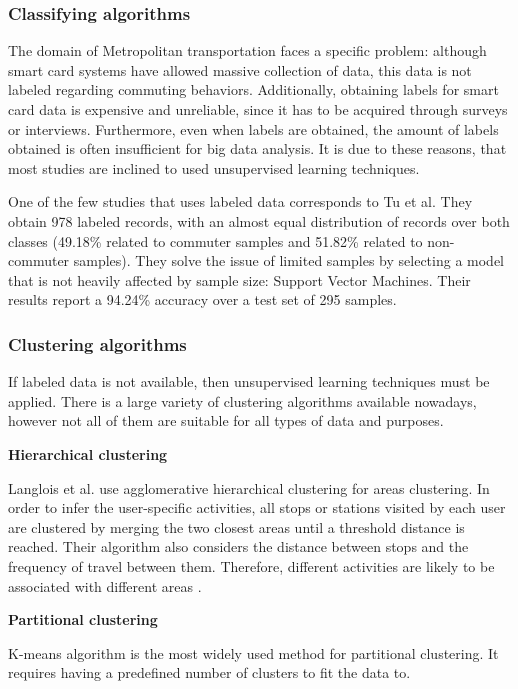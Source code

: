 \documentclass{article}
\begin{document}
\subsubsection{Classifying algorithms}
The domain of Metropolitan transportation faces a specific problem: although smart card systems have allowed massive collection of data, this data is not labeled regarding commuting behaviors. Additionally, obtaining labels for smart card data is expensive and unreliable, since it has to be acquired through surveys or interviews. Furthermore, even when labels are obtained, the amount of labels obtained is often insufficient for big data analysis. It is due to these reasons, that most studies are inclined to used unsupervised learning techniques. 

One of the few studies that uses labeled data corresponds to Tu et al. They obtain 978 labeled records, with an almost equal distribution of records over both classes (49.18\% related to commuter samples and 51.82\% related to non-commuter samples). They solve the issue of limited samples by selecting a model that is not heavily affected by sample size: Support Vector Machines. Their results report a 94.24\% accuracy over a test set of 295 samples. 

\subsubsection{Clustering algorithms} 
If labeled data is not available, then unsupervised learning techniques must be applied. There is a large variety of clustering algorithms available nowadays, however not all of them are suitable for all types of data and purposes.

\textbf{Hierarchical clustering}

Langlois et al. use agglomerative hierarchical clustering for areas clustering. In order to infer the user-specific activities, all stops or stations visited by each user are clustered by merging the two closest areas until a threshold distance is reached. Their algorithm also considers the distance between stops and the frequency of travel between them. Therefore, different activities are likely to be associated with different areas \cite{langlois2016inferring}.

\textbf{Partitional clustering}

K-means algorithm is the most widely used method for partitional clustering. It requires having a predefined number of clusters to fit the data to. 
\end{document}
